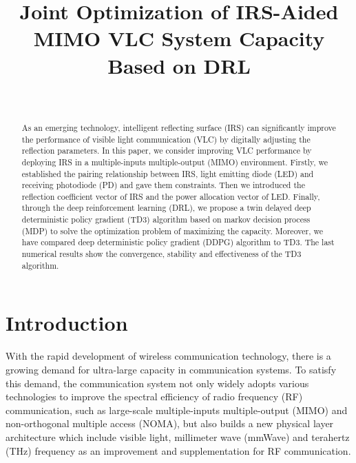 \documentclass[conference]{IEEEtran}
\begin{document}
\title{Joint Optimization of IRS-Aided MIMO VLC System Capacity Based on DRL\\
}

\author{
~\\
}

\maketitle

\begin{abstract}
As an emerging technology, intelligent reﬂecting surface (IRS) can significantly 
improve the performance of visible light communication (VLC) by 
digitally adjusting the reflection parameters. In this paper, we consider improving 
VLC performance by deploying IRS in a multiple-inputs multiple-output (MIMO) environment. 
Firstly, we established the pairing relationship between IRS, light emitting diode (LED) 
and receiving photodiode (PD) and gave them constraints. Then we introduced the reflection coefficient 
vector of IRS and the power allocation vector of LED. Finally, through the deep 
reinforcement learning (DRL), we propose a 
twin delayed deep deterministic policy gradient (TD3) algorithm based on markov decision 
process (MDP) to solve the optimization problem of maximizing the capacity. Moreover, 
we have compared deep deterministic policy gradient (DDPG) algorithm to TD3. The last numerical 
results show the convergence, stability and effectiveness of the TD3 algorithm.
\end{abstract}
\section{Introduction}
   With the rapid development of wireless communication technology, there is a growing
   demand for ultra-large capacity in communication systems. To satisfy this demand, 
   the communication system not only widely adopts various technologies to improve 
   the spectral efficiency of radio frequency (RF) communication, such as large-scale 
   multiple-inputs multiple-output (MIMO) and non-orthogonal multiple access (NOMA), 
   but also builds a new physical layer architecture which include visible light, 
   millimeter wave (mmWave) and terahertz (THz) frequency as an improvement and 
   supplementation for RF communication\cite{1}.
\end{document}
